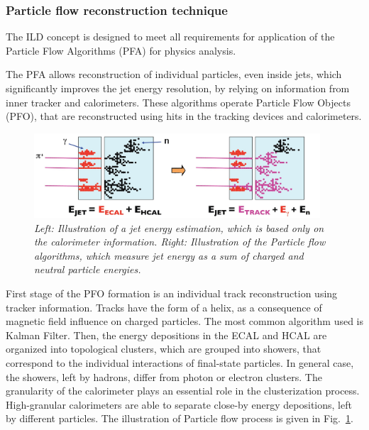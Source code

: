 

\subsubsection{Particle flow reconstruction technique}
The ILD concept is designed to meet all requirements for application of the Particle Flow Algorithms (PFA) for physics analysis. 

The PFA allows reconstruction of individual particles, even inside jets, which significantly improves the jet energy resolution, by relying on information from inner tracker and calorimeters.
These algorithms operate Particle Flow Objects (PFO), that are reconstructed using hits in the tracking devices and calorimeters. 

\begin{figure}
{\centering
    \includegraphics[width=0.95\textwidth]{graphics/calirometry_traditional_new.jpg}
    \caption{\sl Left: Illustration of a jet energy estimation, which is based only on the calorimeter information. Right: Illustration of the Particle flow algorithms, which measure jet energy as a sum of charged and neutral particle energies.}
    \label{fig:PFAillustration}
  }
\end{figure}

First stage of the PFO formation is an individual track reconstruction using tracker information. Tracks have the form of a helix, as a consequence of magnetic field influence on charged particles.  The most common algorithm used is Kalman Filter.
Then, the energy depositions in the ECAL and HCAL are organized into topological clusters, which are grouped into showers, that correspond to the individual interactions of final-state particles. In general case, the showers, left by hadrons, differ from photon or electron clusters. The granularity of the calorimeter plays an essential role in the clusterization process. High-granular calorimeters are able to separate close-by energy depositions, left by different particles. The illustration of Particle flow process is given in Fig.~\ref{fig:PFAillustration}.

